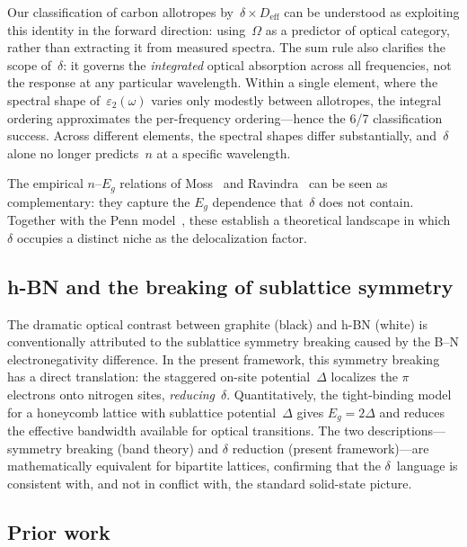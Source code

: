 \documentclass[twocolumn,showpacs,preprintnumbers,amsmath,amssymb,prb]{revtex4-2}
\begin{document}
Our classification of carbon allotropes by~$\delta \times D_\mathrm{eff}$
can be understood as exploiting this identity in the forward
direction: using~$\Omega$ as a predictor of optical category, rather
than extracting it from measured spectra. The sum rule also clarifies
the scope of~$\delta$: it governs the \emph{integrated} optical
absorption across all frequencies, not the response at any
particular wavelength. Within a single element, where the spectral
shape of~$\varepsilon_2(\omega)$ varies only modestly between
allotropes, the integral ordering approximates the per-frequency
ordering---hence the 6/7 classification success. Across different
elements, the spectral shapes differ substantially, and~$\delta$
alone no longer predicts~$n$ at a specific wavelength.

The empirical $n$--$E_g$ relations of Moss~\cite{Moss1950} and
Ravindra~\cite{Ravindra2007} can be seen as complementary:
they capture the $E_g$ dependence that~$\delta$ does not contain.
Together with the Penn model~\cite{Penn1962}, these establish
a theoretical landscape in which~$\delta$ occupies a distinct niche
as the delocalization factor.

\subsection{h-BN and the breaking of sublattice symmetry}
\label{sec:hBN_discussion}

The dramatic optical contrast between graphite (black) and h-BN (white)
is conventionally attributed to the sublattice symmetry breaking caused
by the B--N electronegativity difference. In the present framework, this
symmetry breaking has a direct translation: the staggered on-site
potential~$\Delta$ localizes the $\pi$ electrons onto nitrogen sites,
\emph{reducing}~$\delta$. Quantitatively, the tight-binding model for a
honeycomb lattice with sublattice potential~$\Delta$ gives
$E_g = 2\Delta$ and reduces the effective bandwidth available for
optical transitions. The two descriptions---symmetry breaking (band
theory) and $\delta$ reduction (present framework)---are mathematically
equivalent for bipartite lattices, confirming that the $\delta$~language
is consistent with, and not in conflict with, the standard solid-state
picture.

\subsection{Prior work}
\end{document}
